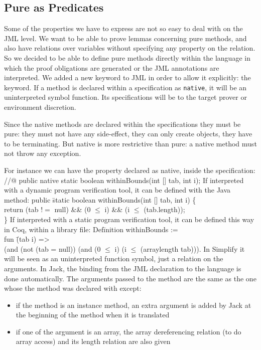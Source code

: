 \subsection{Pure as Predicates}
Some of the properties we have to express are not so easy to deal with 
on the JML level. 
We want to be able to prove lemmas concerning pure methods, and also have 
relations over  variables without specifying any property on the relation. 
So we decided to be able to define pure methods directly within 
the language in which the proof 
obligations are generated or the JML annotations are interpreted. 
We added a new keyword to JML in order to allow it explicitly: 
the  keyword. 
If a method is declared within a specification as {\tt native}, 
it will be an uninterpreted symbol function.
Its specifications will be to the target prover or environment discretion.

Since the native methods are declared within the specifications they must 
be pure: they must not have any side-effect, they can only create objects, 
they have to be terminating. 
But native is more restrictive than pure: 
a native method must not throw any exception.


For instance we can have the property  declared as native, 
inside the specification:
\btab
//@ public native static boolean withinBounds(int [] tab, int i); 
\etab
If interpreted with a dynamic program verification tool, it
can be defined with the Java method:
\btab
public \= static boolean withinBounds(int [] tab, int i) \{\+\\
    return (tab $!=$ null) \&\& (0 $\le$ i) \&\& (i $\le$ (tab.length));\-\\
\}
\etab
If interpreted with a static program verification tool,
it can be defined this way in Coq, within a library file:
\btab
Def\=inition withinBounds := \+\\
fun \= (tab i) =>\+\\
       (and (not (tab = null)) (and (0 $\le$ i) (i $\le$ (arraylength tab))).
\etab
In Simplify it will be seen as an uninterpreted function symbol, 
just a relation on the arguments.
In Jack, the binding from the JML declaration to the  
language is done automatically.
The arguments passed to the method are the same as the one whose the method 
was declared with except:
\begin{itemize}
\item if the method is an instance method, an extra argument  
is added by Jack 
  at the beginning of the method when it is translated
\item if one of the argument is an array, the array dereferencing relation
(to do array access) and its length relation are also given
\end{itemize}


